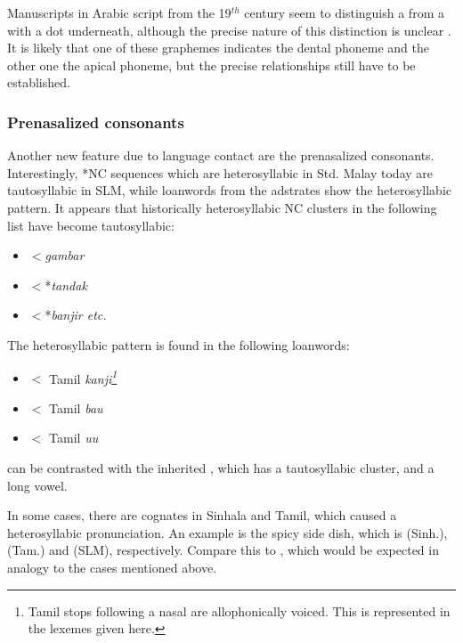 Manuscripts in Arabic script from the 19$^{th}$ century seem to distinguish a  from a  with a dot underneath, although the precise nature of this distinction is unclear \citep[120f]{Hussainmiya1987}. It is likely that one of these graphemes indicates the dental phoneme and the other one the apical phoneme, but the precise relationships still have to be established.
 

\subsubsection{Prenasalized consonants}\label{sec:phon:hist:prenasalizedconsonants}
Another new feature due to language contact are the prenasalized consonants. Interestingly, *NC sequences which are heterosyllabic in Std. Malay today are  tautosyllabic in SLM, while loanwords from the adstrates show the heterosyllabic pattern.
It appears that historically heterosyllabic NC clusters in the following list have become tautosyllabic:
\begin{itemize}
 \item {}$<$\em *gambar\em
 \item {}$<$*\em tandak\em
 \item {}$<$*\em banjir \em etc.
\end{itemize}

The heterosyllabic pattern is found in the following loanwords:

\begin{itemize}
 \item   {}$<$ Tamil \em kanji\em\footnote{Tamil stops following a nasal are allophonically voiced. This is represented in the lexemes given here.}
 \item   {}$<$ Tamil \em ba\nz\dz u\em
 \item   {}$<$ Tamil \em \dentt u\nz\dz u
\end{itemize}

 can be contrasted with the inherited , which has a tautosyllabic cluster, and a long vowel.

In some cases, there are cognates in Sinhala and Tamil, which caused a heterosyllabic pronunciation.
An example is the spicy side dish, which is  (Sinh.),  (Tam.) and  (SLM), respectively. Compare this to , which would be expected in analogy to the cases mentioned above.

